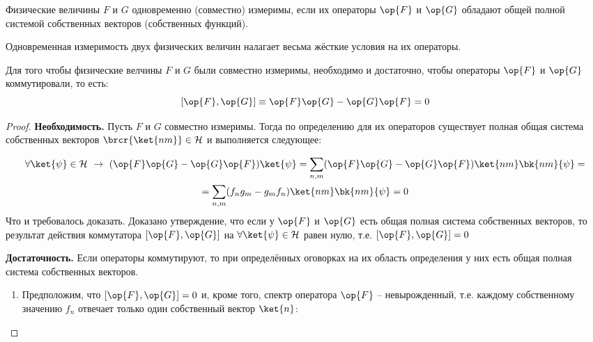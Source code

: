 \begin{defn}
Физические величины $F$ и $G$ одновременно (совместно) измеримы, если их операторы $\op{F}$ и $\op{G}$ обладают общей полной системой собственных векторов (собственных функций).
\end{defn}

Одновременная измеримость двух физических величин налагает весьма жёсткие условия на их операторы.

\begin{thm}\label{theorema_iv_chapter}
Для того чтобы физические велчины $F$ и $G$ были совместно измеримы, необходимо и достаточно, чтобы операторы $\op{F}$ и $\op{G}$ коммутировали, то есть: 
$$[\op{F}, \op{G}] \equiv \op{F}\op{G} - \op{G}\op{F} = 0$$
\end{thm}

\begin{proof}

{\bf Необходимость.} Пусть $F$ и $G$ совместно измеримы. Тогда по определению для их операторов существует полная общая система собственных векторов $\brcr{\ket{nm}} \in \mathcal{H}$ и выполняется следующее:

$$
\begin{gathered}
\forall \ket{\psi} \in \mathcal{H} ~\rightarrow ~
  (\op{F}\op{G} - \op{G}\op{F}) \ket{\psi} =
    \sum_{n,m} (\op{F}\op{G} - \op{G}\op{F}) \ket{nm}\bk{nm}{\psi} = \\ =
    \sum_{n,m} (f_n g_m - g_m f_n) \ket{nm}\bk{nm}{\psi} = 0
\end{gathered}
$$%
%
Что и требовалось доказать. Доказано утверждение, что если у $\op{F}$ и $\op{G}$ есть общая полная система собственных векторов, то результат действия коммутатора $[\op{F}, \op{G}]$ на $\forall \ket{\psi} \in \mathcal{H}$ равен нулю, т.е. $[\op{F}, \op{G}] = 0$

{\bf Достаточность.} Если операторы коммутируют, то при определённых оговорках на их область определения у них есть общая полная система собственных векторов.

\begin{enumerate}
\renewcommand\labelenumi{(\alph{enumi})}

\item Предположим, что $[\op{F}, \op{G}] = 0$ и, кроме того, спектр оператора $\op{F}$ -- невырожденный, т.е. каждому собственному значению $f_n$ отвечает только один собственный вектор $\ket{n}$:


\end{enumerate}
\end{proof}

